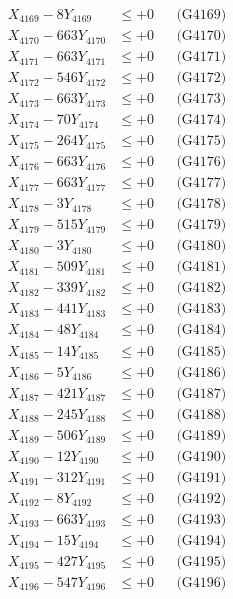 \documentclass[a4paper,10pt]{article}
\begin{document}
{\begin{align}
X_{4169} - 8Y_{4169} &\leq +0 && \text{(G4169)} \\
X_{4170} - 663Y_{4170} &\leq +0 && \text{(G4170)} \\
\allowbreak
X_{4171} - 663Y_{4171} &\leq +0 && \text{(G4171)} \\
X_{4172} - 546Y_{4172} &\leq +0 && \text{(G4172)} \\
X_{4173} - 663Y_{4173} &\leq +0 && \text{(G4173)} \\
X_{4174} - 70Y_{4174} &\leq +0 && \text{(G4174)} \\
X_{4175} - 264Y_{4175} &\leq +0 && \text{(G4175)} \\
X_{4176} - 663Y_{4176} &\leq +0 && \text{(G4176)} \\
X_{4177} - 663Y_{4177} &\leq +0 && \text{(G4177)} \\
X_{4178} - 3Y_{4178} &\leq +0 && \text{(G4178)} \\
X_{4179} - 515Y_{4179} &\leq +0 && \text{(G4179)} \\
X_{4180} - 3Y_{4180} &\leq +0 && \text{(G4180)} \\
\allowbreak
X_{4181} - 509Y_{4181} &\leq +0 && \text{(G4181)} \\
X_{4182} - 339Y_{4182} &\leq +0 && \text{(G4182)} \\
X_{4183} - 441Y_{4183} &\leq +0 && \text{(G4183)} \\
X_{4184} - 48Y_{4184} &\leq +0 && \text{(G4184)} \\
X_{4185} - 14Y_{4185} &\leq +0 && \text{(G4185)} \\
X_{4186} - 5Y_{4186} &\leq +0 && \text{(G4186)} \\
X_{4187} - 421Y_{4187} &\leq +0 && \text{(G4187)} \\
X_{4188} - 245Y_{4188} &\leq +0 && \text{(G4188)} \\
X_{4189} - 506Y_{4189} &\leq +0 && \text{(G4189)} \\
X_{4190} - 12Y_{4190} &\leq +0 && \text{(G4190)} \\
\allowbreak
X_{4191} - 312Y_{4191} &\leq +0 && \text{(G4191)} \\
X_{4192} - 8Y_{4192} &\leq +0 && \text{(G4192)} \\
X_{4193} - 663Y_{4193} &\leq +0 && \text{(G4193)} \\
X_{4194} - 15Y_{4194} &\leq +0 && \text{(G4194)} \\
X_{4195} - 427Y_{4195} &\leq +0 && \text{(G4195)} \\
X_{4196} - 547Y_{4196} &\leq +0 && \text{(G4196)} \\

\end{align}}
\end{document}
